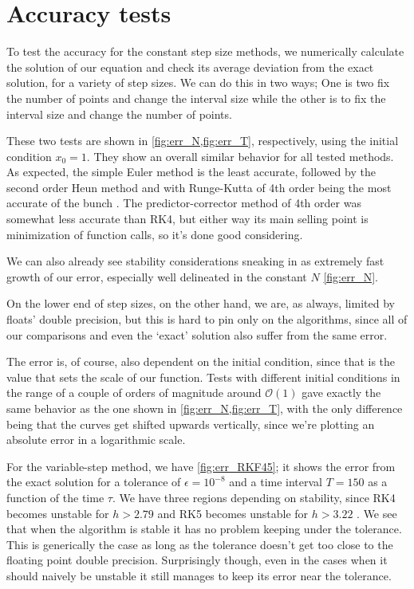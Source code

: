 \documentclass[10pt,a4paper,twocolumn]{article}
\begin{document}
\section{Accuracy tests}

To test the accuracy for the constant step size methods, we numerically calculate the solution of our equation and check its average deviation from the exact solution, for a variety of step sizes. We can do this in two ways; One is two fix the number of points and change the interval size while the other is to fix the interval size and change the number of points.

These two tests are shown in \cref{fig:err_N,fig:err_T}, respectively, using the initial condition $x_0 = 1$. They show an overall similar behavior for all tested methods. As expected, the simple Euler method is the least accurate, followed by the second order Heun method and with Runge-Kutta of 4th order being the most accurate of the bunch \cite{errors}. The predictor-corrector method of 4th order was somewhat less accurate than RK4, but either way its main selling point is minimization of function calls, so it's done good considering.

We can also already see stability considerations sneaking in as extremely fast growth of our error, especially well delineated in the constant $N$ \cref{fig:err_N}.

On the lower end of step sizes, on the other hand, we are, as always, limited by floats' double precision, but this is hard to pin only on the algorithms, since all of our comparisons and even the `exact' solution also suffer from the same error. 

The error is, of course, also dependent on the initial condition, since that is the value that sets the scale of our function. Tests with different initial conditions in the range of a couple of orders of magnitude around $\mathcal{O}(1)$ gave exactly the same behavior as the one shown in \cref{fig:err_N,fig:err_T}, with the only difference being that the curves get shifted upwards vertically, since we're plotting an absolute error in a logarithmic scale.

For the variable-step method, we have \cref{fig:err_RKF45}; it shows the error from the exact solution for a tolerance of $\epsilon = 10^{-8}$ and a time interval $T = 150$ as a function of the time $\tau$. We have three regions depending on stability, since RK4 becomes unstable for $h > 2.79$ and RK5 becomes unstable for $h > 3.22$ \cite{rk_stab}. We see that when the algorithm is stable it has no problem keeping under the tolerance. This is generically the case as long as the tolerance doesn't get too close to the floating point double precision. Surprisingly though, even in the cases when it should naively be unstable it still manages to keep its error near the tolerance.
\end{document}

